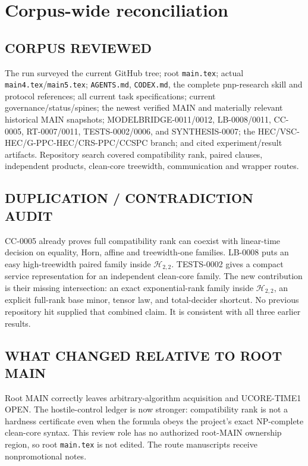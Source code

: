 \documentclass[11pt]{article}
\newcommand{\Htwo}{\mathcal H_{2,2}}
\begin{document}
\section{Corpus-wide reconciliation}

\subsection*{CORPUS REVIEWED}
The run surveyed the current GitHub tree; root \texttt{main.tex}; actual
\texttt{main4.tex}/\texttt{main5.tex}; \texttt{AGENTS.md}, \texttt{CODEX.md},
the complete pnp-research skill and protocol references; all current task
specifications; current governance/status/spines; the newest verified MAIN
and materially relevant historical MAIN snapshots; MODELBRIDGE-0011/0012,
LB-0008/0011, CC-0005, RT-0007/0011, TESTS-0002/0006, and SYNTHESIS-0007;
the HEC/VSC-HEC/G-PPC-HEC/CRS-PPC/CCSPC branch; and cited experiment/result
artifacts.  Repository search covered compatibility rank, paired clauses,
independent products, clean-core treewidth, communication and wrapper routes.

\subsection*{DUPLICATION / CONTRADICTION AUDIT}
CC-0005 already proves full compatibility rank can coexist with linear-time
decision on equality, Horn, affine and treewidth-one families.  LB-0008 puts
an easy high-treewidth paired family inside $\Htwo$.  TESTS-0002 gives a
compact service representation for an independent clean-core family.  The
new contribution is their missing intersection: an exact exponential-rank
family inside $\Htwo$, an explicit full-rank base minor, tensor law, and
total-decider shortcut.  No previous repository hit supplied that combined
claim.  It is consistent with all three earlier results.

\subsection*{WHAT CHANGED RELATIVE TO ROOT MAIN}
Root MAIN correctly leaves arbitrary-algorithm acquisition and UCORE-TIME1
OPEN.  The hostile-control ledger is now stronger: compatibility rank is not
a hardness certificate even when the formula obeys the project's exact
NP-complete clean-core syntax.  This review role has no authorized root-MAIN
ownership region, so root \texttt{main.tex} is not edited.  The route
manuscripts receive nonpromotional notes.
\end{document}
